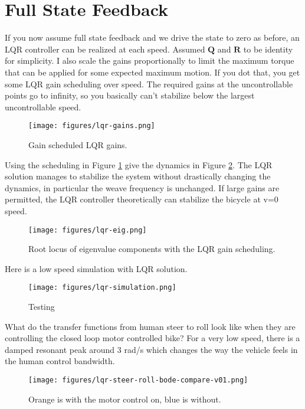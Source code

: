 \documentclass[12pt]{article}
\begin{document}
\section{Full State Feedback}

If you now assume full state feedback and we drive the state to zero as before,
an LQR controller can be realized at each speed. Assumed \(\mathbf{Q}\) and
\(\mathbf{R}\) to be identity for simplicity. I also scale the gains
proportionally to limit the maximum torque that can be applied for some
expected maximum motion. If you dot that, you get some LQR gain scheduling over
speed.  The required gains at the uncontrollable points go to infinity, so you
basically can't stabilize below the largest uncontrollable speed.

\begin{figure}
  \centering
  \texttt{[image: figures/lqr-gains.png]}
  \caption{Gain scheduled LQR gains.}
  \label{fig:lqr-gains}
\end{figure}

Using the scheduling in Figure \ref{fig:lqr-gains} give the dynamics in Figure
\ref{fig:lqr-eig}. The LQR solution manages to stabilize the system without
drastically changing the dynamics, in particular the weave frequency is
unchanged. If large gains are permitted, the LQR controller theoretically can
stabilize the bicycle at v=0 speed.

\begin{figure}
  \centering
  \texttt{[image: figures/lqr-eig.png]}
  \caption{Root locus of eigenvalue components with the LQR gain scheduling.}
  \label{fig:lqr-eig}
\end{figure}

Here is a low speed simulation with LQR solution.

\begin{figure}
  \centering
  \texttt{[image: figures/lqr-simulation.png]}
  \caption{Testing}
  \label{fig:lqr-simulation}
\end{figure}

What do the transfer functions from human steer to roll look like when they are
controlling the closed loop motor controlled bike? For a very low speed, there
is a damped resonant peak around 3 rad/s which changes the way the vehicle
feels in the human control bandwidth.

\begin{figure}
  \centering
  \texttt{[image: figures/lqr-steer-roll-bode-compare-v01.png]}
  \caption{Orange is with the motor control on, blue is without.}
  \label{fig:lqr-steer-roll-bode-compare-v01}
\end{figure}
\end{document}
